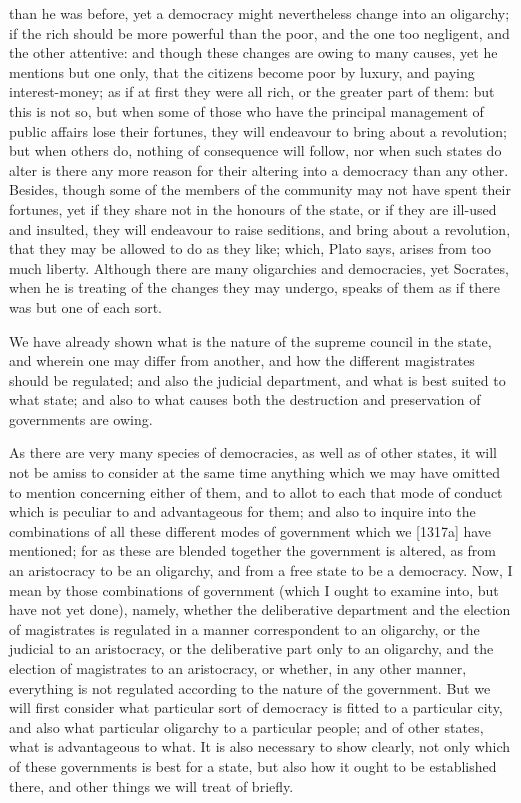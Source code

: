 than he was before, yet a democracy might nevertheless change into an
oligarchy; if the rich should be more powerful than the poor, and the one
too negligent, and the other attentive: and though these changes are owing
to many causes, yet he mentions but one only, that the citizens become
poor by luxury, and paying interest-money; as if at first they were all
rich, or the greater part of them: but this is not so, but when some of
those who have the principal management of public affairs lose their
fortunes, they will endeavour to bring about a revolution; but when others
do, nothing of consequence will follow, nor when such states do alter is
there any more reason for their altering into a democracy than any other.
Besides, though some of the members of the community may not have spent
their fortunes, yet if they share not in the honours of the state, or if
they are ill-used and insulted, they will endeavour to raise seditions,
and bring about a revolution, that they may be allowed to do as they like;
which, Plato says, arises from too much liberty. Although there are many
oligarchies and democracies, yet Socrates, when he is treating of the
changes they may undergo, speaks of them as if there was but one of each
sort.



We have already shown what is the nature of the supreme council in the
state, and wherein one may differ from another, and how the different
magistrates should be regulated; and also the judicial department, and
what is best suited to what state; and also to what causes both the
destruction and preservation of governments are owing.

As there are very many species of democracies, as well as of other states,
it will not be amiss to consider at the same time anything which we may
have omitted to mention concerning either of them, and to allot to each
that mode of conduct which is peculiar to and advantageous for them; and
also to inquire into the combinations of all these different modes of
government which we [1317a] have mentioned; for as these are blended
together the government is altered, as from an aristocracy to be an
oligarchy, and from a free state to be a democracy. Now, I mean by those
combinations of government (which I ought to examine into, but have not
yet done), namely, whether the deliberative department and the election of
magistrates is regulated in a manner correspondent to an oligarchy, or the
judicial to an aristocracy, or the deliberative part only to an oligarchy,
and the election of magistrates to an aristocracy, or whether, in any
other manner, everything is not regulated according to the nature of the
government. But we will first consider what particular sort of democracy
is fitted to a particular city, and also what particular oligarchy to a
particular people; and of other states, what is advantageous to what. It
is also necessary to show clearly, not only which of these governments is
best for a state, but also how it ought to be established there, and other
things we will treat of briefly.

